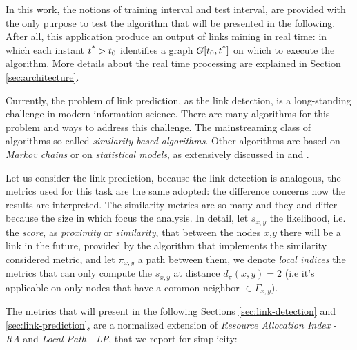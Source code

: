 In this work, the notions of training interval and test interval, are provided with the only purpose to test the algorithm that will be presented in the following. After all, this application produce an output of links mining in real time: in which each instant $t\textsuperscript{*}>t_{0}$ identifies a graph $G[t_{0},t\textsuperscript{*}]$ on which to execute the algorithm. More details about the real time processing are explained in Section \ref{sec:architecture}.

Currently, the problem of link prediction, as the link detection, is a long-standing challenge in modern information science. There are many algorithms for this problem and ways to address this challenge. The mainstreaming class of algorithms so-called \textit{similarity-based algorithms}. Other algorithms are based on \textit{Markov chains} or on \textit{statistical models}, as extensively discussed in \cite{Liben-Nowell} and \cite{Lu2011}.

Let us consider the link prediction, because the link detection is analogous, the metrics used for this task are the same adopted: the difference concerns how the results are interpreted. The similarity metrics are so many and they and differ because the size in which focus the analysis. In detail, let $s_{x,y}$ the likelihood, i.e. the \textit{score}, as \textit{proximity} or \textit{similarity}, that between the nodes $x$,$y$ there will be a link in the future, provided by the algorithm that implements the similarity considered metric, and let $\pi_{x,y}$ a path between them, we denote \textit{local indices} the metrics that can only compute the $s_{x,y}$ at distance $d_{\pi}(x,y) = 2$ (i.e it's applicable on only nodes that have a common neighbor $\in \Gamma_{x,y}$). 


The metrics that will present in the following Sections \ref{sec:link-detection} and \ref{sec:link-prediction}, are a normalized extension of \textit{Resource Allocation Index} - \textit{RA} \cite{Lu2011,zhou2009predicting} and        \textit{Local Path} - \textit{LP}\cite{Lu2011,zhou2009predicting,lu2009similarity}, that we report for simplicity:

